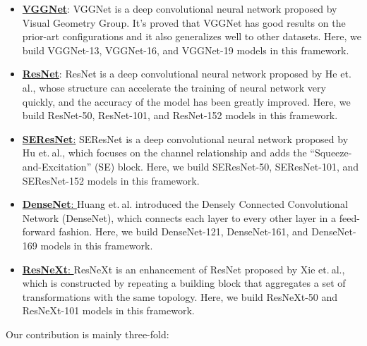 \documentclass[10pt,twocolumn,letterpaper]{article}
\begin{document}
\begin{itemize}
    \item \href{https://arxiv.org/pdf/1409.1556.pdf}{\textbf{VGGNet}}: \textsf{VGGNet} is a deep convolutional neural network proposed by Visual Geometry Group. It's proved that \textsf{VGGNet} has good results on the prior-art configurations and it also generalizes well to other datasets. Here, we build \textsf{VGGNet-13}, \textsf{VGGNet-16}, and \textsf{VGGNet-19} models in this framework.
    
    \item \href{https://arxiv.org/pdf/1512.03385.pdf}{\textbf{ResNet}}: \textsf{ResNet} is a deep convolutional neural network proposed by He et.$\ $al., whose structure can accelerate the training of neural network very quickly, and the accuracy of the model has been greatly improved. Here, we build \textsf{ResNet-50}, \textsf{ResNet-101}, and \textsf{ResNet-152} models in this framework.
    
    \item \href{https://arxiv.org/pdf/1709.01507.pdf}{\textbf{SEResNet}:} \textsf{SEResNet} is a deep convolutional neural network proposed by Hu et.$\ $al., which focuses on the channel relationship and adds the ``Squeeze-and-Excitation'' (SE) block. Here, we build \textsf{SEResNet-50}, \textsf{SEResNet-101}, and \textsf{SEResNet-152} models in this framework.
    
    \item \href{https://arxiv.org/pdf/1608.06993.pdf}{\textbf{DenseNet}: } Huang et.$\ $al. introduced the Densely Connected Convolutional Network (\textsf{DenseNet}), which connects each layer to every other layer in a feed-forward fashion. Here, we build \textsf{DenseNet-121}, \textsf{DenseNet-161}, and \textsf{DenseNet-169} models in this framework.
    
    \item \href{https://arxiv.org/pdf/1611.05431.pdf}{\textbf{ResNeXt}: }  \textsf{ResNeXt} is an enhancement of \textsf{ResNet} proposed by Xie et.$\ $al., which is constructed by repeating a building block that aggregates a set of transformations with the same topology. Here, we build \textsf{ResNeXt-50} and \textsf{ResNeXt-101} models in this framework.
\end{itemize}

Our contribution is mainly three-fold:
\end{document}
